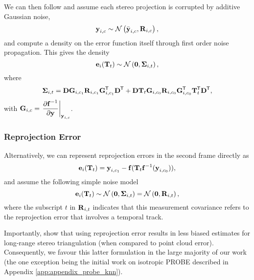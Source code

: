 \noindent We can then follow \cite{Maimone2007-tc} and assume each stereo projection is corrupted by additive Gaussian noise,
\begin{equation}
\boldsymbol{\mathbf{y}}_{i, c} \sim \mathcal{N}\left(\bar{\boldsymbol{\mathbf{y}}}_{i,c}, \boldsymbol{\mathbf{R}}_{i,c} \right), 
\end{equation}  
and compute a density on the error function itself through first order noise propagation. This gives the density
 \begin{equation}
  \boldsymbol{\mathbf{e}}_{i}(\boldsymbol{\mathbf{T}}_t) \sim
 \mathcal{N}\left(\boldsymbol{\mathbf{0}}, \boldsymbol{\mathbf{\Sigma}}_{i,t} \right), 
\end{equation}
where
\begin{equation}
	\boldsymbol{\mathbf{\Sigma}}_{i,t} = \boldsymbol{\mathbf{D}}\boldsymbol{\mathbf{G}}_{i,c_1} \boldsymbol{\mathbf{R}}_{i,c_1}  \boldsymbol{\mathbf{G}}_{i,c_1}^{\mkern-1.0mu\mathsf{T}} \boldsymbol{\mathbf{D}}^{\mkern-1.0mu\mathsf{T}} + 
 \boldsymbol{\mathbf{D}}\boldsymbol{\mathbf{T}}_t \boldsymbol{\mathbf{G}}_{i,c_0}  \boldsymbol{\mathbf{R}}_{i,c_0} \boldsymbol{\mathbf{G}}_{i,c_0}^{\mkern-1.0mu\mathsf{T}}  \boldsymbol{\mathbf{T}}_t^{\mkern-1.0mu\mathsf{T}} \boldsymbol{\mathbf{D}}^{\mkern-1.0mu\mathsf{T}},
\end{equation}
with
$\boldsymbol{\mathbf{G}}_{i,c} = \left.\dfrac{\partial \boldsymbol{\mathbf{f}}^{-1}}{\partial \boldsymbol{\mathbf{y}}}\right|_{\boldsymbol{\mathbf{y}}_{i, c}}$.

\subsubsection{Reprojection Error}
\label{sec:vo_reprojection}
Alternatively, we can represent reprojection errors in the second frame directly as
\begin{equation}
  \boldsymbol{\mathbf{e}}_{i}(\boldsymbol{\mathbf{T}}_t)  = \boldsymbol{\mathbf{y}}_{i, c_1} - \boldsymbol{\mathbf{f}}( \boldsymbol{\mathbf{T}}_t 
    \boldsymbol{\mathbf{f}}^{-1}( \boldsymbol{\mathbf{y}}_{i, c_0} ) ),
   \label{eq:image_error}
\end{equation}
\noindent and assume the following simple noise model
 \begin{equation}
  \boldsymbol{\mathbf{e}}_{i}(\boldsymbol{\mathbf{T}}_t) \sim \mathcal{N}\left(\boldsymbol{\mathbf{0}}, \boldsymbol{\mathbf{\Sigma}}_{i,t} \right) = 
 \mathcal{N}\left(\boldsymbol{\mathbf{0}},  \boldsymbol{\mathbf{R}}_{i,t}\right), 
\end{equation}
where the subscript $t$ in $\boldsymbol{\mathbf{R}}_{i,t}$ indicates that this measurement covariance refers to the reprojection error that involves a temporal track.

Importantly, \cite{Sibley2007} show that using reprojection error results in less biased estimates for long-range stereo triangulation (when compared to point cloud error). Consequently, we favour this latter formulation in the large majority of our work (the one exception being the initial work on isotropic PROBE described in Appendix \ref{app:appendix_probe_knn}).

